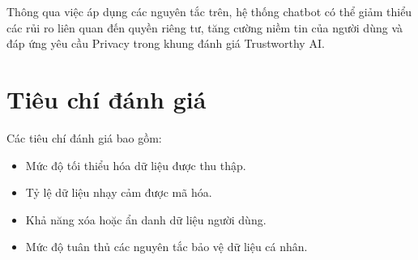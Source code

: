Thông qua việc áp dụng các nguyên tắc trên, hệ thống chatbot có thể giảm thiểu các rủi ro liên quan đến quyền riêng tư, tăng cường niềm tin của người dùng và đáp ứng yêu cầu Privacy trong khung đánh giá Trustworthy AI.

\section{Tiêu chí đánh giá}
Các tiêu chí đánh giá bao gồm:
\begin{itemize}
    \item Mức độ tối thiểu hóa dữ liệu được thu thập.
\item Tỷ lệ dữ liệu nhạy cảm được mã hóa.
\item Khả năng xóa hoặc ẩn danh dữ liệu người dùng.
\item Mức độ tuân thủ các nguyên tắc bảo vệ dữ liệu cá nhân.
\end{itemize}
